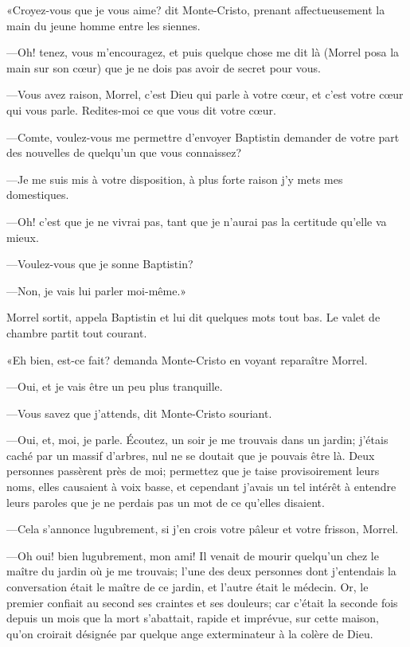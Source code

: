 «Croyez-vous que je vous aime? dit Monte-Cristo, prenant affectueusement la main du jeune homme entre les siennes. 

—Oh! tenez, vous m'encouragez, et puis quelque chose me dit là (Morrel posa la main sur son cœur) que je ne dois pas avoir de secret pour vous. 

—Vous avez raison, Morrel, c'est Dieu qui parle à votre cœur, et c'est votre cœur qui vous parle. Redites-moi ce que vous dit votre cœur. 

—Comte, voulez-vous me permettre d'envoyer Baptistin demander de votre part des nouvelles de quelqu'un que vous connaissez? 

—Je me suis mis à votre disposition, à plus forte raison j'y mets mes domestiques. 

—Oh! c'est que je ne vivrai pas, tant que je n'aurai pas la certitude qu'elle va mieux. 

—Voulez-vous que je sonne Baptistin? 

—Non, je vais lui parler moi-même.» 

Morrel sortit, appela Baptistin et lui dit quelques mots tout bas. Le valet de chambre partit tout courant. 

«Eh bien, est-ce fait? demanda Monte-Cristo en voyant reparaître Morrel. 

—Oui, et je vais être un peu plus tranquille. 

—Vous savez que j'attends, dit Monte-Cristo souriant. 

—Oui, et, moi, je parle. Écoutez, un soir je me trouvais dans un jardin; j'étais caché par un massif d'arbres, nul ne se doutait que je pouvais être là. Deux personnes passèrent près de moi; permettez que je taise provisoirement leurs noms, elles causaient à voix basse, et cependant j'avais un tel intérêt à entendre leurs paroles que je ne perdais pas un mot de ce qu'elles disaient. 

—Cela s'annonce lugubrement, si j'en crois votre pâleur et votre frisson, Morrel. 

—Oh oui! bien lugubrement, mon ami! Il venait de mourir quelqu'un chez le maître du jardin où je me trouvais; l'une des deux personnes dont j'entendais la conversation était le maître de ce jardin, et l'autre était le médecin. Or, le premier confiait au second ses craintes et ses douleurs; car c'était la seconde fois depuis un mois que la mort s'abattait, rapide et imprévue, sur cette maison, qu'on croirait désignée par quelque ange exterminateur à la colère de Dieu. 

